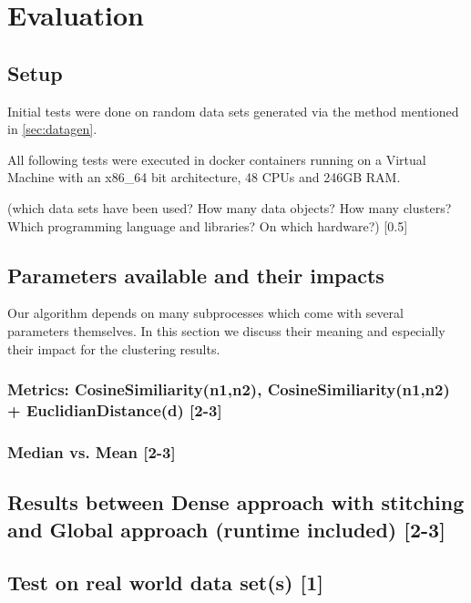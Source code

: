 \chapter{Evaluation}

\section{Setup}
Initial tests were done on random data sets generated via the method mentioned in \autoref{sec:datagen}. 

All following tests were executed in docker containers running on a Virtual Machine with an x86\_64 bit architecture, 48 CPUs and 246GB RAM. 

(which data sets have been used? How many data objects? How many clusters? Which programming language and libraries? On which hardware?) [0.5]

\section{Parameters available and their impacts}
Our algorithm depends on many subprocesses which come with several parameters themselves. In this section we discuss their meaning and especially their impact for the clustering results.

\subsection{Metrics: CosineSimiliarity(n1,n2), CosineSimiliarity(n1,n2) + EuclidianDistance(d) [2-3]}

\subsection{Median vs.  Mean [2-3]}

\section{Results between Dense approach with stitching and Global approach (runtime included) [2-3]
}

\section{Test on real world data set(s) [1]}

